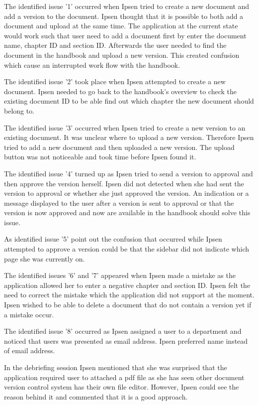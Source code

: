 The identified issue '1' occurred when Ipsen tried to create a new document and add a version to the document.
Ipsen thought that it is possible to both add a document and upload at the same time.
The application at the current state would work such that user need to add a document first by enter the document name, chapter ID and section ID. Afterwards the user needed to find the document in the handbook and upload a new version.
This created confusion which cause an interrupted work flow with the handbook.

The identified issue '2' took place when Ipsen attempted to create a new document.
Ipsen needed to go back to the handbook's overview to check the existing document ID to be able find out which chapter the new document should belong to.

The identified issue '3' occurred when Ipsen tried to create a new version to an existing document.
It was unclear where to upload a new version.
Therefore Ipsen tried to add a new document and then uploaded a new version.
The upload button was not noticeable and took time before Ipsen found it.

The identified issue '4' turned up as Ipsen tried to send a version to approval and then  approve the version herself.
Ipsen did not detected when she had sent the version to approval or whether she just approved the version.
An indication or a message displayed to the user after a version is sent to approval or that the version is now approved and now are available in the handbook should solve this issue.

As identified issue '5' point out the confusion that occurred while Ipsen attempted to approve a version could be that the sidebar did not indicate which page she was currently on.

The identified issues '6' and '7' appeared when Ipsen made a mistake as the application allowed her to enter a negative chapter and section ID.
Ipsen felt the need to correct the mistake which the application did not support at the moment.
Ipsen wished to be able to delete a document that do not contain a version yet if a mistake occur.

The identified issue '8' occurred as Ipsen assigned a user to a department and noticed that users was presented as email address.
Ipsen preferred name instead of email address.

In the debriefing session Ipsen mentioned that she was surprised that the application required user to attached a pdf file as she has seen other document version control system has their own file editor.
However, Ipsen could see the reason behind it and commented that it is a good approach.

